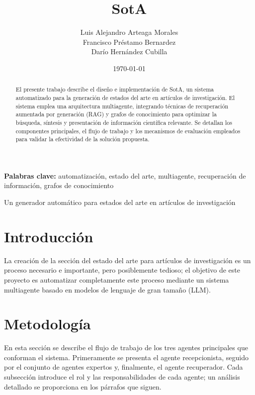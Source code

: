 \documentclass[12pt]{article}
\title{SotA}
\author{Luis Alejandro Arteaga Morales \\ Francisco Préstamo Bernardez \\ Darío Hernández Cubilla}
\date{\today}
\newcommand{\subtitle}{Un generador automático para estados del arte en artículos de investigación}
\begin{document}
\begin{abstract}
El presente trabajo describe el diseño e implementación de SotA, un sistema automatizado para la generación de estados del arte en artículos de investigación. El sistema emplea una arquitectura multiagente, integrando técnicas de recuperación aumentada por generación (RAG) y grafos de conocimiento para optimizar la búsqueda, síntesis y presentación de información científica relevante. Se detallan los componentes principales, el flujo de trabajo y los mecanismos de evaluación empleados para validar la efectividad de la solución propuesta.
\end{abstract}

\textbf{Palabras clave:} automatización, estado del arte, multiagente, recuperación de información, grafos de conocimiento

\begin{center}
    {\LARGE \thetitle\par}
    \vspace{0.5em}
    {\large \subtitle\par}
    \vspace{1em}
    {\large \theauthor\par}
    \vspace{0.5em}
    {\normalsize \thedate\par}
\end{center}

\vspace{2em}

\tableofcontents
\newpage

\section{Introducción}
La creación de la sección del estado del arte para artículos de investigación es un proceso necesario e importante, pero posiblemente tedioso; el objetivo de este proyecto es automatizar completamente este proceso mediante un sistema multiagente basado en modelos de lenguaje de gran tamaño (LLM).

\section{Metodología}
En esta sección se describe el flujo de trabajo de los tres agentes principales que conforman el sistema. Primeramente se presenta el agente recepcionista, seguido por el conjunto de agentes expertos y, finalmente, el agente recuperador. Cada subsección introduce el rol y las responsabilidades de cada agente; un análisis detallado se proporciona en los párrafos que siguen.
\end{document}
